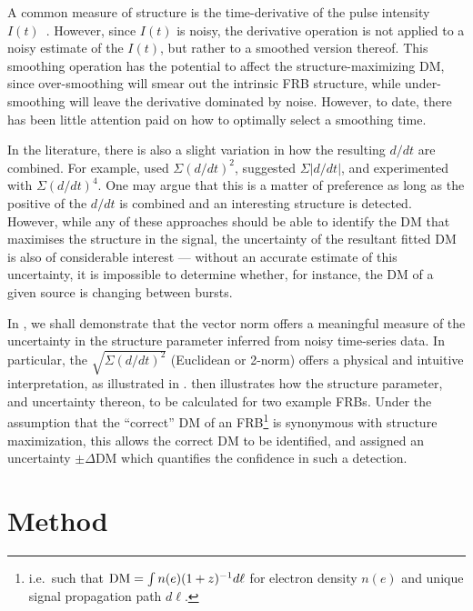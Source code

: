 \documentclass[twocolumn]{aastex631}
\begin{document}
A common measure of structure is the time-derivative of the pulse intensity $I(t)$~\citep{Gajjar_2018, Hessels_2019, Josephy_2019, Andersen2019, Pilia_2020}. However, since $I(t)$ is noisy, the derivative operation is not applied to a noisy estimate of the $I(t)$, but rather to a smoothed version thereof.
This smoothing operation has the potential to affect the structure-maximizing DM, since over-smoothing will smear out the intrinsic FRB structure, while under-smoothing will leave the derivative dominated by noise.  However, to date, there has been little attention paid on how to optimally select a smoothing time.

In the literature, there is also a slight variation in how the resulting $d/dt$ are combined. For example, \citet{Hessels_2019} used $\Sigma \left(d/dt\right)^2$, \citet{Gajjar_2018} suggested $\Sigma \left|d/dt\right|$, and \citet{Josephy_2019} experimented with $\Sigma \left(d/dt\right)^4$. One may argue that this is a matter of preference as long as the positive of the $d/dt$ is combined and an interesting structure is detected.
However, while any of these approaches should be able to identify the DM that maximises the structure in the signal, the uncertainty of the resultant fitted DM is also of considerable interest --- without an accurate estimate of this uncertainty, it is impossible to determine whether, for instance, the DM of a given source is changing between bursts.

In , we shall demonstrate that the vector norm offers a meaningful measure of the uncertainty in the structure parameter inferred from noisy time-series data. In particular, the  $\sqrt{\Sigma (d/dt)^2}$ (Euclidean or 2-norm) offers a physical and intuitive interpretation, as illustrated in .  then illustrates how the structure parameter, and uncertainty thereon, to be calculated for two example FRBs. Under the assumption that the ``correct'' DM of an FRB\footnote{i.e.\ such that ${\rm DM}=\int n(e) (1+z)^{-1} d\ell$ for electron density $n(e)$ and unique signal propagation path $d \ell$.} is synonymous with structure maximization, this allows the correct DM to be identified, and assigned an uncertainty 
$\pm \Delta \text{DM}$ which quantifies the confidence in such a detection.

\section{Method} \label{sec:method}
\end{document}
